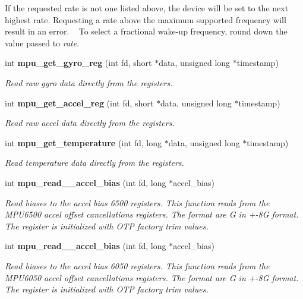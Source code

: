 \begin{DoxyCompactItemize}
\begin{DoxyCompactList}
 If the requested rate is not one listed above, the device will be set to the next highest rate. Requesting a rate above the maximum supported frequency will result in an error. ~\newline
 To select a fractional wake-\/up frequency, round down the value passed to {\itshape rate}. \end{DoxyCompactList}\item 
int \textbf{ mpu\+\_\+get\+\_\+gyro\+\_\+reg} (int fd, short $\ast$data, unsigned long $\ast$timestamp)
\begin{DoxyCompactList}\small\item\em Read raw gyro data directly from the registers. \end{DoxyCompactList}\item 
int \textbf{ mpu\+\_\+get\+\_\+accel\+\_\+reg} (int fd, short $\ast$data, unsigned long $\ast$timestamp)
\begin{DoxyCompactList}\small\item\em Read raw accel data directly from the registers. \end{DoxyCompactList}\item 
int \textbf{ mpu\+\_\+get\+\_\+temperature} (int fd, long $\ast$data, unsigned long $\ast$timestamp)
\begin{DoxyCompactList}\small\item\em Read temperature data directly from the registers. \end{DoxyCompactList}\item 
int \textbf{ mpu\+\_\+read\+\_\+\_\+accel\+\_\+bias} (int fd, long $\ast$accel\+\_\+bias)
\begin{DoxyCompactList}\small\item\em Read biases to the accel bias 6500 registers. This function reads from the M\+P\+U6500 accel offset cancellations registers. The format are G in +-\/8G format. The register is initialized with O\+TP factory trim values. \end{DoxyCompactList}\item 
int \textbf{ mpu\+\_\+read\+\_\+\_\+accel\+\_\+bias} (int fd, long $\ast$accel\+\_\+bias)
\begin{DoxyCompactList}\small\item\em Read biases to the accel bias 6050 registers. This function reads from the M\+P\+U6050 accel offset cancellations registers. The format are G in +-\/8G format. The register is initialized with O\+TP factory trim values. \end{DoxyCompactList}\item 

\end{DoxyCompactItemize}
